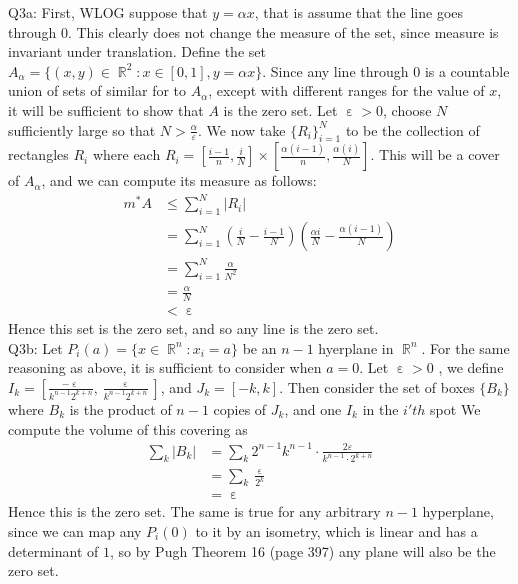 \documentclass[letterpaper]{article}
\DeclareMathOperator{\R}{\mathbb{R}}
\DeclareMathOperator{\ep}{\varepsilon}
\begin{document}
\noindent Q3a: First, WLOG suppose that $y=\alpha x$, that is assume that the line goes through 0. This clearly does not change the measure of the set, since measure is invariant under translation. Define the set $A_{\alpha} = \{(x,y)\in \R^2: x\in [0,1], y=\alpha x\}$. Since any line through 0 is a countable union of sets of similar for to $A_\alpha$, except with different ranges for the value of $x$, it will be sufficient to show that $A$ is the zero set. Let $\ep >0$, choose $N$ sufficiently large so that $N>\frac{\alpha}{\varepsilon}$. We now take $\{R_i\}_{i=1}^N$ to be
the collection of rectangles $R_i$ where each $R_i = [\frac{i-1}{n},\frac{i}{N}]\times [\frac{\alpha(i-1)}{n}, \frac{\alpha(i)}{N}]$. This will be a cover of $A_\alpha$, and we can compute its measure as follows: 
\begin{align*}
    m^*A & \leq \sum_{i=1}^N |R_i|
    \\ & = \sum_{i=1}^N (\frac{i}{N} - \frac{i-1}{N})(\frac{\alpha i}{N} - \frac{\alpha(i-1)}{N})
    \\ & = \sum_{i=1}^N \frac{\alpha}{N^2}
    \\ & = \frac{\alpha}{N}
    \\ & < \ep
\end{align*}Hence this set is the zero set, and so any line is the zero set. 
\newline \\ Q3b: Let $P_i(a) = \{x\in \R^n : x_i =a\}$ be an $n-1$ hyerplane in $\R^n$. For the same reasoning as above, it is sufficient to consider when $a=0$. Let $\ep>0$ , we define $I_k= [\frac{-\ep}{k^{n-1} 2^{k+n}}, \frac{\ep}{k^{n-1}2^{k+n}}]$, and $J_k = [-k,k]$. Then consider the set of boxes $\{B_k\}$ where $B_k$ is the product of $n-1$ copies of $J_k$, and one $I_k$ in the $i'th$ spot
We compute the volume of this covering as 
\begin{align*}
    \sum_{k}|B_k| & = \sum_{k} 2^{n-1}k^{n-1}\cdot \frac{2\varepsilon}{k^{n-1} \cdot 2^{k+n}}
    \\ & = \sum_{k} \frac{\ep}{2^k}
    \\ & = \ep
\end{align*}Hence this is the zero set. The same is true for any arbitrary $n-1$ hyperplane, since we can map any $P_i(0)$ to it by an isometry, which is linear and has a determinant of $1$, so by Pugh Theorem 16 (page 397) any plane will also be the zero set. 
\end{document}
